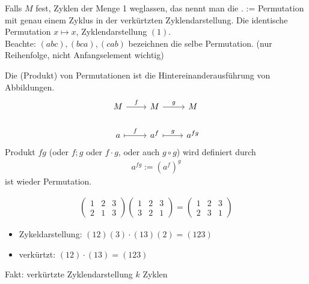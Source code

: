 Falls $M$ fest, Zyklen der Menge 1 weglassen, das nennt man die .  := Permutation mit genau einem Zyklus in der verkürtzten Zyklendarstellung. Die identische Permutation $x \mapsto x$, Zyklendarstellung $(1)$.\\
Beachte: $(abc),(bca),(cab)$ bezeichnen die selbe Permutation. (nur Reihenfolge, nicht Anfangselement wichtig)
\begin{definition}
	\label{sec1:def:multiplication_permu}
	Die  (Produkt) von Permutationen ist die Hintereinanderausführung von Abbildungen.
	\[
	\begin{tikzcd}
		M \arrow[r, "f"]     & M \arrow[r, "g"]       & M      \\
		a \arrow[r, maps to, "f"] & a^f \arrow[r, maps to, "g"] & a^{fg}
	\end{tikzcd}
	\]
	Produkt $fg$ (oder $f;g$ oder $f\cdot g$, oder auch $g \circ g$) wird definiert durch 
	\begin{align*}
		a^{fg}:= (a^f)^g
	\end{align*} 
	ist wieder Permutation.
\end{definition}
\begin{example}
	\begin{align*}
		\begin{pmatrix}
			1 & 2 &3\\
			2 & 1 &3
		\end{pmatrix}
		\begin{pmatrix}
			1 & 2 & 3\\
			3 & 2 & 1
		\end{pmatrix}=
		\begin{pmatrix}
			1 & 2 & 3\\
			2 & 3 & 1
		\end{pmatrix}
	\end{align*}
	\begin{itemize}
		\item Zykeldarstellung: $(12)(3)\cdot (13)(2) = (123)$
		\item verkürtzt: $(12)\cdot(13) = (123)$ 
	\end{itemize}
\end{example}
Fakt: verkürtzte Zyklendarstellung $k$ Zyklen
